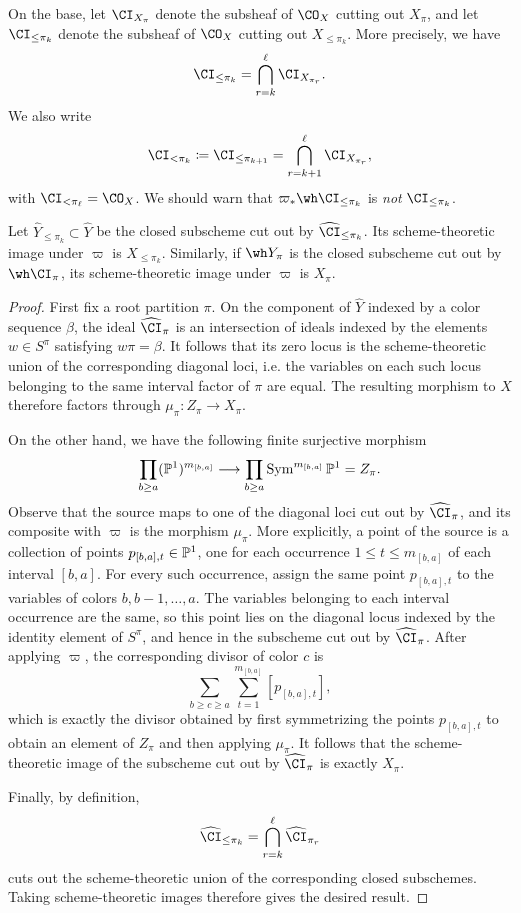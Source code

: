 \documentclass[11pt,reqno]{amsart}
\begin{document}
On the base, let $\CI_{X_\pi}$ denote the subsheaf of $\CO_X$ cutting out $X_\pi$, and let $\CI_{\le\pi_k}$ denote the subsheaf of $\CO_X$ cutting out $X_{\le\pi_k}$. More precisely, we have
\[\CI_{\le\pi_k}=\bigcap_{r=k}^{\ell}\CI_{X_{\pi_r}}.\]
We also write
\[\CI_{<\pi_k}\coloneqq\CI_{\le\pi_{k+1}}=\bigcap_{r=k+1}^{\ell}\CI_{X_{\pi_r}},\]with $\CI_{<\pi_\ell}=\CO_X$. We should warn that $\varpi_*\wh\CI_{\le\pi_k}$ is \textit{not} $\CI_{\le\pi_k}$.

\begin{lemma}\label{lem:Yhat filt vs X filt}
Let $\widehat Y_{\le\pi_k}\subset \widehat Y$ be the closed
subscheme cut out by $\widehat{\CI}_{\le\pi_k}$. Its
scheme-theoretic image under $\varpi$ is $X_{\le\pi_k}$. Similarly, if $\wh Y_\pi$ is the closed subscheme cut out by $\wh\CI_\pi$, its scheme-theoretic image under $\varpi$ is $X_\pi$. 
\end{lemma}
\begin{proof}First fix a root partition $\pi$. On the component of $\widehat Y$
indexed by a color sequence $\beta$, the ideal
$\widehat{\CI}_\pi$ is an intersection of ideals indexed by the
elements $w\in S^\pi$ satisfying $w\pi=\beta$. It follows that its
zero locus is the scheme-theoretic union of the corresponding
diagonal loci, i.e. the variables on each such locus belonging to the
same interval factor of $\pi$ are equal. The resulting morphism to
$X$ therefore factors through $\mu_\pi\colon Z_\pi\longrightarrow X_\pi.$

On the other hand, we have the following finite surjective morphism \[\prod_{b\ge a}(\mathbb P^1)^{m_{[b,a]}}
\longrightarrow\prod_{b\ge a}\operatorname{Sym}^{m_{[b,a]}}\mathbb P^1=Z_\pi.\]Observe that the source maps to one of the diagonal loci cut out by
$\widehat{\CI}_\pi$, and its composite with $\varpi$ is the morphism $\mu_\pi$. More explicitly, a point of the source is a collection of points $p_{[b,a],t}\in\mathbb P^1$, one for each
occurrence $1\le t\le m_{[b,a]}$ of each interval $[b,a]$.
For every such occurrence, assign the same point $p_{[b,a],t}$ to
the variables of colors $b,b-1,\ldots,a$. The variables belonging to each interval occurrence are the same, so
this point lies on the diagonal locus indexed by the identity element
of $S^\pi$, and hence in the subscheme cut out by
$\widehat{\CI}_\pi$. After applying $\varpi$, the corresponding divisor of color $c$ is
\[\sum_{b\ge c\ge a}\sum_{t=1}^{m_{[b,a]}}[p_{[b,a],t}],\] which is exactly the divisor obtained by first symmetrizing the points
$p_{[b,a],t}$ to obtain an element of $Z_\pi$ and then applying
$\mu_\pi$.
It follows that the
scheme-theoretic image of the subscheme cut out by
$\widehat{\CI}_\pi$ is exactly $X_\pi$.

Finally, by definition, \[\widehat{\CI}_{\le\pi_k}=
\bigcap_{r=k}^{\ell}\widehat{\CI}_{\pi_r}\]
cuts out the scheme-theoretic union of the corresponding closed
subschemes. Taking scheme-theoretic images therefore gives the desired result.    
\end{proof}
\end{document}
